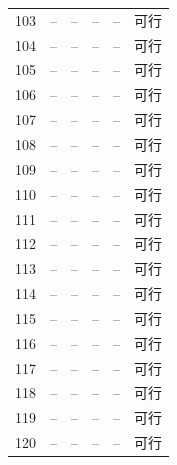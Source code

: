 \begin{longtable}{cccccc}
103 & -- & -- & -- & -- & 可行\\
104 & -- & -- & -- & -- & 可行\\
105 & -- & -- & -- & -- & 可行\\
106 & -- & -- & -- & -- & 可行\\
107 & -- & -- & -- & -- & 可行\\
108 & -- & -- & -- & -- & 可行\\
109 & -- & -- & -- & -- & 可行\\
110 & -- & -- & -- & -- & 可行\\
111 & -- & -- & -- & -- & 可行\\
112 & -- & -- & -- & -- & 可行\\
113 & -- & -- & -- & -- & 可行\\
114 & -- & -- & -- & -- & 可行\\
115 & -- & -- & -- & -- & 可行\\
116 & -- & -- & -- & -- & 可行\\
117 & -- & -- & -- & -- & 可行\\
118 & -- & -- & -- & -- & 可行\\
119 & -- & -- & -- & -- & 可行\\
120 & -- & -- & -- & -- & 可行\\
\bottomrule
\end{longtable}
\normalsize
